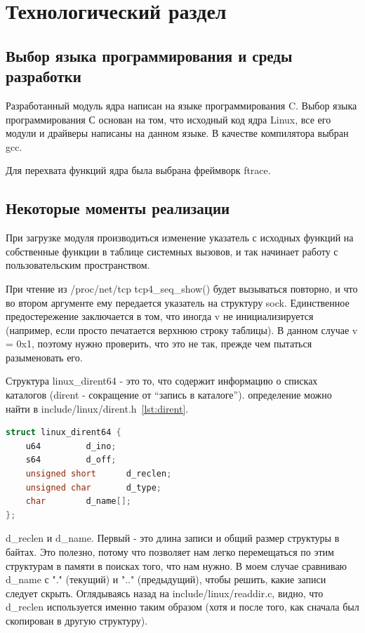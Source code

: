 \chapter{Технологический раздел}%
\label{cha:tekhnologicheskii_razdel}

\section{Выбор языка программирования и среды разработки}%
\label{sec:vybor_iazyka_programmirovaniia_i_sredy_razrabotki}

Разработанный модуль ядра написан на языке программирования C. Выбор языка программирования С основан на том, что исходный код
ядра Linux, все его модули и драйверы написаны на данном языке.
В качестве компилятора выбран gcc.

Для перехвата функций ядра была выбрана фреймворк ftrace.

\section{Некоторые моменты реализации}%
\label{sec:nekotorye_momenty_realizatsii}

При загрузке модуля производиться изменение указатель с исходных функций на собственные функции в таблице системных вызовов, и так начинает работу с пользовательским пространством.

При чтение из /proc/net/tcp tcp4\_seq\_show() будет вызываться повторно, и что во втором аргументе ему передается указатель на структуру sock. Единственное предостережение заключается в том, что иногда v не инициализируется (например, если просто печатается верхнюю строку таблицы). В данном случае v = 0x1, поэтому нужно проверить, что это не так, прежде чем пытаться разыменовать его.

Структура linux\_dirent64 - это то, что содержит информацию о списках каталогов (dirent - сокращение от “запись в каталоге”). определение можно найти в include/linux/dirent.h~\ref{lst:dirent}.

\begin{lstlisting}[language=c,caption={структура linux\_dirent64}, label=lst:dirent]
struct linux_dirent64 {
    u64         d_ino;
    s64         d_off;
    unsigned short      d_reclen;
    unsigned char       d_type;
    char        d_name[];
};
\end{lstlisting}

d\_reclen и d\_name. Первый - это длина записи и общий размер структуры в байтах. Это полезно, потому что позволяет нам легко перемещаться по этим структурам в памяти в поисках того, что нам нужно. В моем случае сравниваю d\_name с "." (текущий) и ".." (предыдущий), чтобы решить, какие записи следует скрыть. Оглядываясь назад на include/linux/readdir.c, видно, что d\_reclen используется именно таким образом (хотя и после того, как сначала был скопирован в другую структуру).

